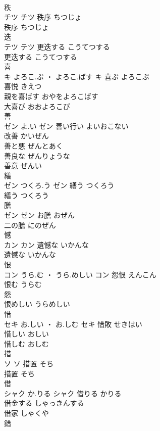 \documentclass[8pt]{extreport}
\begin{document}
\begin{CJK}{UTF8}{min}
\\	秩	
\\	チツ		チツ	秩序	ちつじょ	
\\	秩序	ちつじょ	
\\	迭	
\\	テツ		テツ	更迭する	こうてつする	
\\	更迭する	こうてつする	
\\	喜	
\\	キ	よろこ.ぶ ・ よろこ.ばす	キ	喜ぶ	よろこぶ	
\\	喜悦	きえつ	
\\	親を喜ばす	おやをよろこばす	
\\	大喜び	おおよろこび	
\\	善	
\\	ゼン	よ.い	ゼン	善い行い	よいおこない	
\\	改善	かいぜん	
\\	善と悪	ぜんとあく	
\\	善良な	ぜんりょうな	
\\	善意	ぜんい	
\\	繕	
\\	ゼン	つくろ.う	ゼン	繕う	つくろう	
\\	繕う	つくろう	
\\	膳	
\\	ゼン		ゼン	お膳	おぜん	
\\	二の膳	にのぜん	
\\	憾	
\\	カン		カン	遺憾な	いかんな	
\\	遺憾な	いかんな	
\\	恨	
\\	コン	うら.む ・ うら.めしい	コン	怨恨	えんこん	
\\	恨む	うらむ	
\\	怨 
\\	恨めしい	うらめしい	
\\	惜	
\\	セキ	お.しい ・ お.しむ	セキ	惜敗	せきはい	
\\	惜しい	おしい	
\\	惜しむ	おしむ	
\\	措	
\\	ソ		ソ	措置	そち	
\\	措置	そち	
\\	借	
\\	シャク	か.りる	シャク	借りる	かりる	
\\	借金する	しゃっきんする	
\\	借家	しゃくや	
\\	錯	

\end{CJK}
\end{document}
